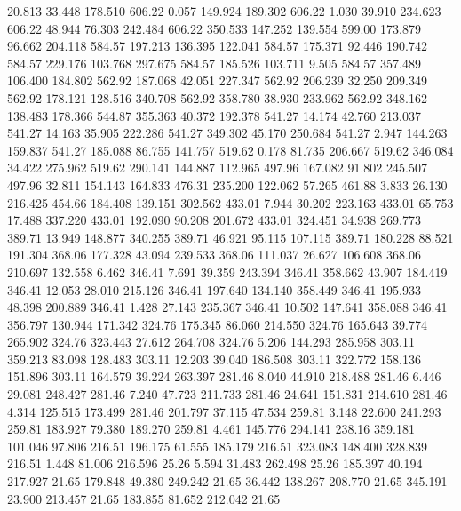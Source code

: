  20.813   33.448  178.510       606.22
   0.057  149.924  189.302       606.22
   1.030   39.910  234.623       606.22
  48.944   76.303  242.484       606.22
 350.533  147.252  139.554       599.00
 173.879   96.662  204.118       584.57
 197.213  136.395  122.041       584.57
 175.371   92.446  190.742       584.57
 229.176  103.768  297.675       584.57
 185.526  103.711    9.505       584.57
 357.489  106.400  184.802       562.92
 187.068   42.051  227.347       562.92
 206.239   32.250  209.349       562.92
 178.121  128.516  340.708       562.92
 358.780   38.930  233.962       562.92
 348.162  138.483  178.366       544.87
 355.363   40.372  192.378       541.27
  14.174   42.760  213.037       541.27
  14.163   35.905  222.286       541.27
 349.302   45.170  250.684       541.27
   2.947  144.263  159.837       541.27
 185.088   86.755  141.757       519.62
   0.178   81.735  206.667       519.62
 346.084   34.422  275.962       519.62
 290.141  144.887  112.965       497.96
 167.082   91.802  245.507       497.96
  32.811  154.143  164.833       476.31
 235.200  122.062   57.265       461.88
   3.833   26.130  216.425       454.66
 184.408  139.151  302.562       433.01
   7.944   30.202  223.163       433.01
  65.753   17.488  337.220       433.01
 192.090   90.208  201.672       433.01
 324.451   34.938  269.773       389.71
  13.949  148.877  340.255       389.71
  46.921   95.115  107.115       389.71
 180.228   88.521  191.304       368.06
 177.328   43.094  239.533       368.06
 111.037   26.627  106.608       368.06
 210.697  132.558    6.462       346.41
   7.691   39.359  243.394       346.41
 358.662   43.907  184.419       346.41
  12.053   28.010  215.126       346.41
 197.640  134.140  358.449       346.41
 195.933   48.398  200.889       346.41
   1.428   27.143  235.367       346.41
  10.502  147.641  358.088       346.41
 356.797  130.944  171.342       324.76
 175.345   86.060  214.550       324.76
 165.643   39.774  265.902       324.76
 323.443   27.612  264.708       324.76
   5.206  144.293  285.958       303.11
 359.213   83.098  128.483       303.11
  12.203   39.040  186.508       303.11
 322.772  158.136  151.896       303.11
 164.579   39.224  263.397       281.46
   8.040   44.910  218.488       281.46
   6.446   29.081  248.427       281.46
   7.240   47.723  211.733       281.46
  24.641  151.831  214.610       281.46
   4.314  125.515  173.499       281.46
 201.797   37.115   47.534       259.81
   3.148   22.600  241.293       259.81
 183.927   79.380  189.270       259.81
   4.461  145.776  294.141       238.16
 359.181  101.046   97.806       216.51
 196.175   61.555  185.179       216.51
 323.083  148.400  328.839       216.51
   1.448   81.006  216.596        25.26
   5.594   31.483  262.498        25.26
 185.397   40.194  217.927        21.65
 179.848   49.380  249.242        21.65
  36.442  138.267  208.770        21.65
 345.191   23.900  213.457        21.65
 183.855   81.652  212.042        21.65
